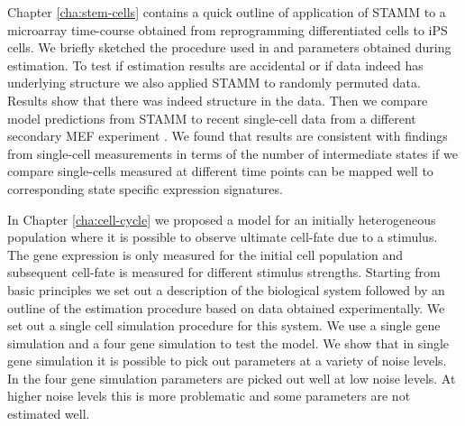 
Chapter \ref{cha:stem-cells} contains a quick outline of application of STAMM to a microarray time-course obtained from reprogramming differentiated cells to iPS cells. We briefly sketched the procedure used in \cite{Armond:2013} and parameters obtained during estimation. To test if estimation results are accidental or if data indeed has underlying structure we also applied STAMM to randomly permuted data. Results show that there was indeed structure in the data.  Then we compare model predictions from STAMM to recent single-cell data from a different secondary MEF experiment \citep{Buganim:2012hp}. We found that results are consistent with findings from single-cell measurements in terms of the number of intermediate states if we compare single-cells measured at different time points can be mapped well to corresponding state specific expression signatures.

In Chapter \ref{cha:cell-cycle} we proposed a model for an initially heterogeneous population where it is possible to observe ultimate cell-fate due to a stimulus. The gene expression is only measured for the initial cell population and subsequent cell-fate is measured for different stimulus strengths. Starting from basic principles we set out a description of the biological system followed by an outline of the estimation procedure based on data obtained experimentally. We set out a single cell simulation procedure for this system. We use a single gene simulation and a four gene simulation to test the model. We show that in single gene simulation it is possible to pick out parameters at a variety of noise levels. In the four gene simulation parameters are picked out well at low noise levels. At higher noise levels this is more problematic and some parameters are not estimated well. 

